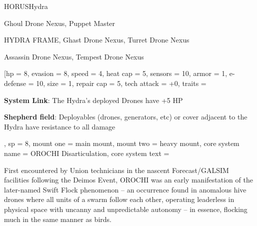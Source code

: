 
\begin{mech}{HORUS}{Hydra}


\begin{license}
\item Ghoul Drone Nexus, Puppet Master
\item HYDRA FRAME, Ghast Drone Nexus, Turret Drone Nexus
\item Assassin Drone Nexus, Tempest Drone Nexus
\end{license}


\frameBox
[hp = 8,
evasion = 8,
speed = 4,
heat cap = 5,
sensors = 10,
armor = 1,
e-defense = 10,
size = 1,
repair cap = 5,
tech attack = +0,
traits = {\textbf{System Link}: The Hydra’s deployed Drones have +5 HP

\textbf{Shepherd field}: Deployables (drones, generators, etc) or cover adjacent to the Hydra have resistance to all damage},
sp = 8,
mount one = main mount,
mount two = heavy mount,
core system name = OROCHI Disarticulation,
core system text = {First encountered by Union technicians in the nascent Forecast/GALSIM facilities following the Deimos Event, OROCHI was an early manifestation of the later-named Swift Flock phenomenon -- an occurrence found in anomalous hive drones where all units of a swarm follow each other, operating leaderless in physical space with uncanny and unpredictable autonomy -- in essence, flocking much in the same manner as birds.

}
\end{mech}

